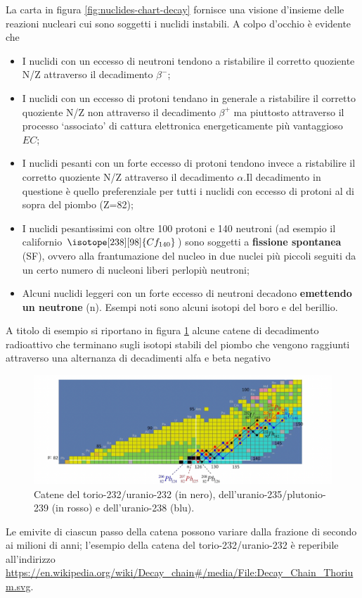 La carta in figura \ref{fig:nuclides-chart-decay} fornisce una visione d’insieme delle reazioni nucleari cui sono
soggetti i nuclidi instabili.
A colpo d’occhio è evidente che
\begin{itemize}
    \item I nuclidi con un eccesso di neutroni tendono a ristabilire il corretto quoziente N/Z
    attraverso il decadimento $ \beta^-$;
    \item I nuclidi con un eccesso di protoni tendano in generale a ristabilire il corretto quoziente N/Z non attraverso
    il decadimento $ \beta^+$ ma piuttosto attraverso il processo ‘associato’ di cattura elettronica energeticamente più
    vantaggioso $EC$;
    \item I nuclidi pesanti con un forte eccesso di protoni tendono invece a ristabilire il corretto quoziente N/Z
    attraverso il decadimento $ \alpha$.Il decadimento in questione è quello preferenziale per tutti i nuclidi con
    eccesso di protoni al di sopra del piombo (Z=82);
    \item I nuclidi pesantissimi con oltre 100 protoni e 140 neutroni (ad esempio il californio $ \isotope[238][98]{\mathlarger{Cf}_{140}}$)
    sono soggetti a \textbf{fissione spontanea} (SF), ovvero alla frantumazione del nucleo in due nuclei più piccoli seguiti
    da un certo numero di nucleoni liberi perlopiù neutroni;
    \item Alcuni nuclidi leggeri con un forte eccesso di neutroni decadono \textbf{emettendo un neutrone} (n).
    Esempi noti sono alcuni isotopi del boro e del berillio.
\end{itemize}

A titolo di esempio si riportano in figura \ref{fig:decay-chain1} alcune catene di decadimento radioattivo che terminano sugli
isotopi stabili del piombo che vengono raggiunti attraverso una alternanza di decadimenti alfa e beta negativo

\begin{figure}
    \centering
    \includegraphics{../figs/decay-chain1}
    \caption{Catene del torio-232/uranio-232 (in nero), dell’uranio-235/plutonio-239 (in rosso) e dell’uranio-238 (blu).}
    \label{fig:decay-chain1}
\end{figure}

Le emivite di ciascun passo della catena possono variare dalla frazione di secondo ai milioni di anni;
l’esempio della catena del torio-232/uranio-232 è reperibile all'indirizzo
\url{https://en.wikipedia.org/wiki/Decay_chain#/media/File:Decay_Chain_Thorium.svg}.